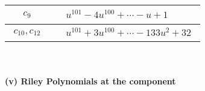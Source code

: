 \documentclass[1p]{elsarticle_modified}
\theoremstyle{definition}
\begin{document}
\begin{tabular}{m{50pt}|m{274pt}}
\hline $$\begin{aligned}c_{9}\end{aligned}$$&$\begin{aligned}
&u^{101}-4 u^{100}+\cdots- u+1
\end{aligned}$\\
\hline $$\begin{aligned}c_{10},c_{12}\end{aligned}$$&$\begin{aligned}
&u^{101}+3 u^{100}+\cdots-133 u^2+32
\end{aligned}$\\
\hline
\end{tabular}\\~\\
\newpage\renewcommand{\arraystretch}{1}
\flushleft \textbf{(v) Riley Polynomials at the component}\newline \\
\end{document}
